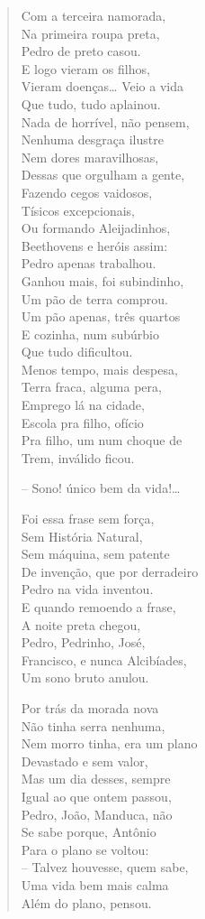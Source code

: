 {\begin{verse}
Com a terceira namorada,\\
Na primeira roupa preta,\\
Pedro de preto casou.\\
E logo vieram os filhos,\\
Vieram doenças\ldots{} Veio a vida\\
Que tudo, tudo aplainou.\\
Nada de horrível, não pensem,\\
Nenhuma desgraça ilustre\\
Nem dores maravilhosas,\\
Dessas que orgulham a gente,\\
Fazendo cegos vaidosos,\\
Tísicos excepcionais,\\
Ou formando Aleijadinhos,\\
Beethovens e heróis assim:\\
Pedro apenas trabalhou.\\
Ganhou mais, foi subindinho,\\
Um pão de terra comprou.\\
Um pão apenas, três quartos\\
E cozinha, num subúrbio\\
Que tudo dificultou.\\
Menos tempo, mais despesa,\\
Terra fraca, alguma pera,\\
Emprego lá na cidade,\\
Escola pra filho, ofício\\
Pra filho, um num choque de\\
Trem, inválido ficou.

-- Sono! único bem da vida!\ldots{}

Foi essa frase sem força,\\
Sem História Natural,\\
Sem máquina, sem patente\\
De invenção, que por derradeiro\\
Pedro na vida inventou.\\
E quando remoendo a frase,\\
A noite preta chegou,\\
Pedro, Pedrinho, José,\\
Francisco, e nunca Alcibíades,\\
Um sono bruto anulou.

Por trás da morada nova\\
Não tinha serra nenhuma,\\
Nem morro tinha, era um plano\\
Devastado e sem valor,\\
Mas um dia desses, sempre\\
Igual ao que ontem passou,\\
Pedro, João, Manduca, não\\
Se sabe porque, Antônio\\
Para o plano se voltou:\\
-- Talvez houvesse, quem sabe,\\
Uma vida bem mais calma\\
Além do plano, pensou.


\end{verse}}
